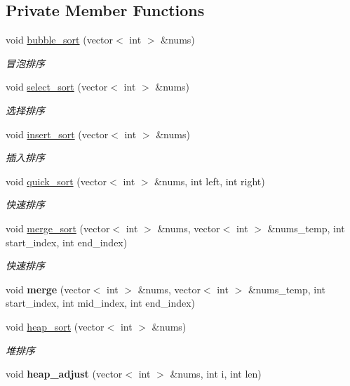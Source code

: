 \subsection*{Private Member Functions}
\begin{DoxyCompactItemize}
\item 
void \hyperlink{class_c_sort_algo_a0ce54b0167d658aedf0f603979761c88}{bubble\+\_\+sort} (vector$<$ int $>$ \&nums)
\begin{DoxyCompactList}\small\item\em 冒泡排序 \end{DoxyCompactList}\item 
void \hyperlink{class_c_sort_algo_aeef7ae8fed73aa9997f4e2443fcfdf4b}{select\+\_\+sort} (vector$<$ int $>$ \&nums)
\begin{DoxyCompactList}\small\item\em 选择排序 \end{DoxyCompactList}\item 
void \hyperlink{class_c_sort_algo_a3095752baa5f6d51934e89baf62d7361}{insert\+\_\+sort} (vector$<$ int $>$ \&nums)
\begin{DoxyCompactList}\small\item\em 插入排序 \end{DoxyCompactList}\item 
void \hyperlink{class_c_sort_algo_ad37a6f012070a0a39dcdb5d6beed4c93}{quick\+\_\+sort} (vector$<$ int $>$ \&nums, int left, int right)
\begin{DoxyCompactList}\small\item\em 快速排序 \end{DoxyCompactList}\item 
void \hyperlink{class_c_sort_algo_a25109772bb378cf42f34813e06d8a9d1}{merge\+\_\+sort} (vector$<$ int $>$ \&nums, vector$<$ int $>$ \&nums\+\_\+temp, int start\+\_\+index, int end\+\_\+index)
\begin{DoxyCompactList}\small\item\em 快速排序 \end{DoxyCompactList}\item 
\hypertarget{class_c_sort_algo_a148af9c8ca6ff69d7eead2464dbbffe5}{}\label{class_c_sort_algo_a148af9c8ca6ff69d7eead2464dbbffe5} 
void {\bfseries merge} (vector$<$ int $>$ \&nums, vector$<$ int $>$ \&nums\+\_\+temp, int start\+\_\+index, int mid\+\_\+index, int end\+\_\+index)
\item 
void \hyperlink{class_c_sort_algo_ad81a03f9e4a3d1d0a3690485c35acd44}{heap\+\_\+sort} (vector$<$ int $>$ \&nums)
\begin{DoxyCompactList}\small\item\em 堆排序 \end{DoxyCompactList}\item 
\hypertarget{class_c_sort_algo_a4e914cae14c15e8a75c7cea33ed9b439}{}\label{class_c_sort_algo_a4e914cae14c15e8a75c7cea33ed9b439} 
void {\bfseries heap\+\_\+adjust} (vector$<$ int $>$ \&nums, int i, int len)
\end{DoxyCompactItemize}
